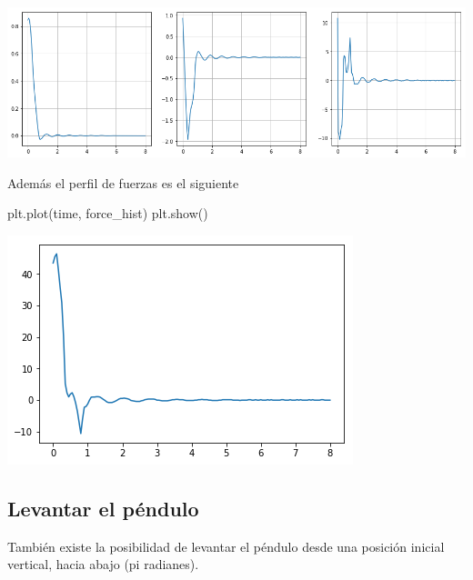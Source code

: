 \documentclass[onecolumn]{article}
\newenvironment{Shaded}{}{}
\newcommand{\NormalTok}[1]{#1}
\begin{document}
\includegraphics{output_34_0.png}

Además el perfil de fuerzas es el siguiente

\begin{Shaded}
\begin{Highlighting}[]
\NormalTok{plt.plot(time, force_hist)}
\NormalTok{plt.show()}
\end{Highlighting}
\end{Shaded}

\includegraphics{output_36_0.png}

\hypertarget{levantar-el-puxe9ndulo}{%
\subsection{Levantar el péndulo}\label{levantar-el-puxe9ndulo}}

También existe la posibilidad de levantar el péndulo desde una posición
inicial vertical, hacia abajo (pi radianes).
\end{document}
